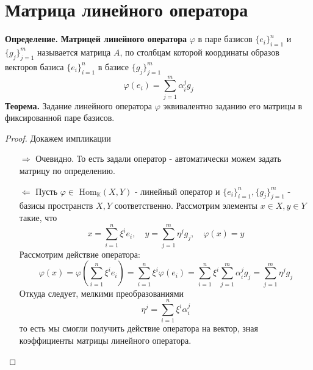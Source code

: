 \documentclass{article}
\newcommand*{\theorem}[2]{\textbf{Теорема#1. } #2 \newline}
\newcommand*{\definition}[1]{\textbf{Определение.} #1 \newline}
\newcommand*{\Hom}[2]{Hom$_\mathbb{K}(#1, #2)$}
\begin{document}
\section{Матрица линейного оператора}
\definition{\textbf{Матрицей линейного оператора} $\varphi$ в паре базисов $\{ e_i\}^n_{i = 1}$ и $\{ g_j \}^m_{j = 1}$ называется матрица $A$, по столбцам которой координаты образов векторов базиса $\{ e_i \}^n_{i = 1}$ в базисе $\{ g_j\}^m_{j = 1}$}
$$
    \varphi(e_i) = \sum_{j = 1}^{m} \alpha^j_ig_j
$$
\theorem{}{Задание линейного оператора $\varphi$ эквивалентно заданию его матрицы в фиксированной паре базисов.}
\begin{proof}
    Докажем импликации
    \begin{itemize}
        \item[$\Rightarrow$] Очевидно. То есть задали оператор - автоматически можем задать матрицу по определению.
        \item[$\Leftarrow$] Пусть $\varphi \in$ \Hom X Y - линейный оператор и $\{ e_i\}^n_{i = 1}, \{ g_j \}^m_{j = 1}$ - базисы пространств $X, Y$ соответственно. Рассмотрим элементы $x \in X, y \in Y$ такие, что
        $$
            x = \sum_{i = 1}^{n} \xi^i e_i, \quad y = \sum_{j = 1}^{m} \eta^j g_j, \quad \varphi(x) = y
        $$
        Рассмотрим действие оператора: 
        $$
            \varphi(x) = \varphi(\sum_{i = 1}^{n} \xi^i e_i) = \sum_{i = 1}^{n} \xi^i \varphi(e_i) = \sum_{i = 1}^{n} \xi^i \sum_{j = 1}^{m} \alpha^j_i g_j = \sum_{j = 1}^{m} \eta^j g_j
        $$
        Откуда следует, мелкими преобразованиями
        $$
            \eta^j = \sum_{i = 1}^{n} \xi^i \alpha^j_i
        $$  
        то есть мы смогли получить действие оператора на вектор, зная коэффициенты матрицы линейного оператора.
    \end{itemize}
\end{proof} 
\end{document}
